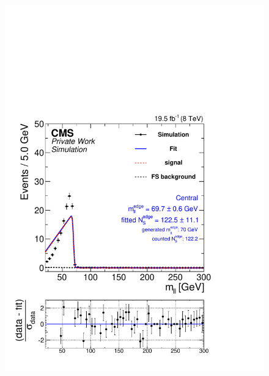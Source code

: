 \begin{figure}[hbp]
  \centering
  \begin{minipage}[t]{0.49\textwidth}
    \includegraphics[width=\textwidth]{plots/results/fit/mcFits/shapeIllustrationKTriangle_SignalInclusive_Combined_Full2012_KTriangle_MC_edge_400_150_80_Central.pdf}
  \end{minipage}
  \begin{minipage}[t]{0.49\textwidth}

\end{minipage}
\end{figure}
